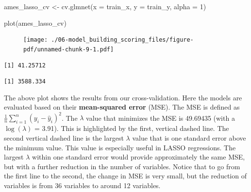 \documentclass[
  letterpaper,
  DIV=11,
  numbers=noendperiod]{scrreprt}
\newenvironment{Shaded}{\begin{snugshade}}{\end{snugshade}}
\newcommand{\AttributeTok}[1]{\textcolor[rgb]{0.40,0.45,0.13}{#1}}
\newcommand{\DecValTok}[1]{\textcolor[rgb]{0.68,0.00,0.00}{#1}}
\newcommand{\FloatTok}[1]{\textcolor[rgb]{0.68,0.00,0.00}{#1}}
\newcommand{\FunctionTok}[1]{\textcolor[rgb]{0.28,0.35,0.67}{#1}}
\newcommand{\NormalTok}[1]{\textcolor[rgb]{0.00,0.23,0.31}{#1}}
\newcommand{\OtherTok}[1]{\textcolor[rgb]{0.00,0.23,0.31}{#1}}
\newcommand{\SpecialCharTok}[1]{\textcolor[rgb]{0.37,0.37,0.37}{#1}}
\begin{document}
\begin{Shaded}
\begin{Highlighting}[]
\NormalTok{ames\_lasso\_cv }\OtherTok{\textless{}{-}} \FunctionTok{cv.glmnet}\NormalTok{(}\AttributeTok{x =}\NormalTok{ train\_x,  }\AttributeTok{y =}\NormalTok{ train\_y,  }\AttributeTok{alpha =} \DecValTok{1}\NormalTok{)}

\FunctionTok{plot}\NormalTok{(ames\_lasso\_cv)}
\end{Highlighting}
\end{Shaded}

\begin{figure}[H]

{\centering \texttt{[image: ./06-model\_building\_scoring\_files/figure-pdf/unnamed-chunk-9-1.pdf]}

}

\end{figure}

\begin{Shaded}
\end{Shaded}

\begin{verbatim}
[1] 41.25712
\end{verbatim}

\begin{Shaded}
\end{Shaded}

\begin{verbatim}
[1] 3588.334
\end{verbatim}

The above plot shows the results from our cross-validation. Here the
models are evaluated based on their \textbf{mean-squared error} (MSE).
The MSE is defined as \(\frac{1}{n} \sum_{i=1}^n (y_i - \hat{y}_i)^2\).
The \(\lambda\) value that minimizes the MSE is 49.69435 (with a
\(\log(\lambda)\) = 3.91). This is highlighted by the first, vertical
dashed line. The second vertical dashed line is the largest \(\lambda\)
value that is one standard error above the minimum value. This value is
especially useful in LASSO regressions. The largest \(\lambda\) within
one standard error would provide approximately the same MSE, but with a
further reduction in the number of variables. Notice that to go from the
first line to the second, the change in MSE is very small, but the
reduction of variables is from 36 variables to around 12 variables.
\end{document}
